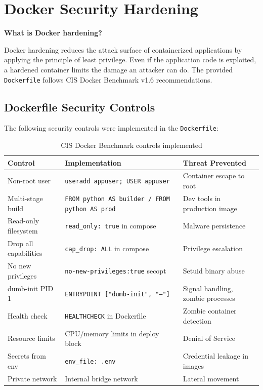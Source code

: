 \documentclass[12pt,a4paper]{report}
\begin{document}
\section{Docker Security Hardening}

\textbf{What is Docker hardening?}

Docker hardening reduces the attack surface of containerized applications by applying the principle of least privilege. Even if the application code is exploited, a hardened container limits the damage an attacker can do. The provided \texttt{Dockerfile} follows CIS Docker Benchmark v1.6 recommendations.

\subsection{Dockerfile Security Controls}

The following security controls were implemented in the \texttt{Dockerfile}:

\begin{table}[H]
\centering
\begin{tabularx}{\textwidth}{l X X}
\toprule
\textbf{Control} & \textbf{Implementation} & \textbf{Threat Prevented} \\
\midrule
Non-root user & \texttt{useradd appuser; USER appuser} & Container escape to root \\
Multi-stage build & \texttt{FROM python AS builder / FROM python AS prod} & Dev tools in production image \\
Read-only filesystem & \texttt{read\_only: true} in compose & Malware persistence \\
Drop all capabilities & \texttt{cap\_drop: ALL} in compose & Privilege escalation \\
No new privileges & \texttt{no-new-privileges:true} secopt & Setuid binary abuse \\
dumb-init PID 1 & \texttt{ENTRYPOINT ["dumb-init", "--"]} & Signal handling, zombie processes \\
Health check & \texttt{HEALTHCHECK} in Dockerfile & Zombie container detection \\
Resource limits & CPU/memory limits in deploy block & Denial of Service \\
Secrets from env & \texttt{env\_file: .env} & Credential leakage in images \\
Private network & Internal bridge network & Lateral movement \\
\bottomrule
\end{tabularx}
\caption{CIS Docker Benchmark controls implemented}
\end{table}
\end{document}
